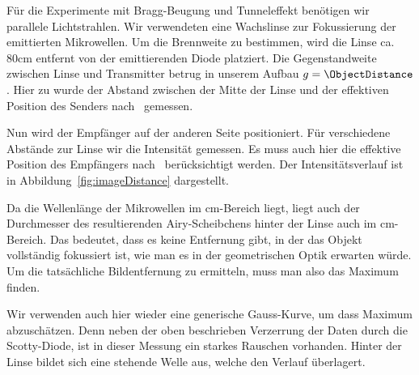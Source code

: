 \documentclass[a4paper,10pt,twocolumn]{article}
\begin{document}

    Für die Experimente mit Bragg-Beugung und Tunneleffekt benötigen wir parallele Lichtstrahlen. 
    Wir verwendeten eine Wachslinse zur Fokussierung der emittierten Mikrowellen. 
    Um die Brennweite zu bestimmen, wird die Linse ca.\ $80 \mathrm{cm}$ entfernt von der emittierenden Diode platziert. 
    Die Gegenstandweite zwischen Linse und Transmitter betrug in unserem Aufbau $g = \ObjectDistance$.
    Hier zu wurde der Abstand zwischen der Mitte der Linse und der effektiven Position des Senders nach~\cite{pasco} gemessen.
    
    Nun wird der Empfänger auf der anderen Seite positioniert.
    Für verschiedene Abstände zur Linse wir die Intensität gemessen.
    Es muss auch hier die effektive Position des Empfängers nach~\cite{pasco} berücksichtigt werden.
    Der Intensitätsverlauf ist in Abbildung~\ref{fig:imageDistance} dargestellt.
    
    Da die Wellenlänge der Mikrowellen im cm-Bereich liegt, liegt auch der Durchmesser 
    des resultierenden Airy-Scheibchens hinter der Linse auch im cm-Bereich.
    Das bedeutet, dass es keine Entfernung gibt, in der das Objekt vollständig fokussiert ist, wie man es in der
    geometrischen Optik erwarten würde. 
    Um die tatsächliche Bildentfernung zu ermitteln, muss man also das Maximum finden.
    
    Wir verwenden auch hier wieder eine generische Gauss-Kurve, um dass Maximum abzuschätzen.
    Denn neben der oben beschrieben Verzerrung der Daten durch die Scotty-Diode, ist in dieser Messung ein
    starkes Rauschen vorhanden.
    Hinter der Linse bildet sich eine stehende Welle aus, welche den Verlauf überlagert.
    
\end{document}
